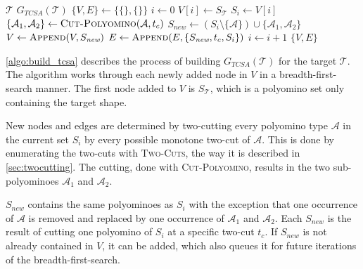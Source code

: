 \begin{algorithm}
	\caption{$\text{\scshape Build-TCSA-Graph}$}
	\label{algo:build_tcsa}
	\begin{algorithmic}[1]
		\REQUIRE $\mathcal{T}$ 
		\ENSURE $G_{\textit{TCSA}}(\mathcal{T})$  
		\STATE $\{V,E\} \gets \{\{\},\{\}\}$
		\STATE $i \gets 0$
		\STATE $V[i] \gets S_\mathcal{T}$ 
			\STATE $S_i \gets V[i]$
					\STATE $\{\mathcal{A}_1, \mathcal{A}_2\} \gets \text{\scshape Cut-Polyomino}(\mathcal{A}, t_c)$
					\STATE $S_\textit{new} \gets \left( S_i \setminus \{\mathcal{A}\} \right) \cup \{\mathcal{A}_1, \mathcal{A}_2\}$ 
						\STATE $V \gets \text{\scshape Append}(V, S_\textit{new})$
					\ENDIF
					\STATE $E \gets \text{\scshape Append}(E, \{S_\textit{new}, t_c, S_i\})$
				\ENDFOR
			\ENDFOR
			\STATE $i \gets i+1$
		\ENDWHILE
		\RETURN $\{V,E\}$
	\end{algorithmic}
\end{algorithm}

\autoref{algo:build_tcsa} describes the process of building $G_{\textit{TCSA}}(\mathcal{T})$ for the target $\mathcal{T}$.
The algorithm works through each newly added node in $V$ in a breadth-first-search manner.
The first node added to $V$ is $S_\mathcal{T}$, which is a polyomino set only containing the target shape.

New nodes and edges are determined by two-cutting every polyomino type $\mathcal{A}$ in the current set $S_i$ by every possible monotone two-cut of $\mathcal{A}$.
This is done by enumerating the two-cuts with {\scshape Two-Cuts}, the way it is described in \autoref{sec:twocutting}.
The cutting, done with {\scshape Cut-Polyomino}, results in the two sub-polyominoes $\mathcal{A}_1$ and $\mathcal{A}_2$.

$S_\textit{new}$ contains the same polyominoes as $S_i$ with the exception that one occurrence of $\mathcal{A}$ is removed and replaced by one occurrence of $\mathcal{A}_1$ and $\mathcal{A}_2$.
Each $S_\textit{new}$ is the result of cutting one polyomino of $S_i$ at a specific two-cut $t_c$.
If $S_\textit{new}$ is not already contained in $V$, it can be added, which also queues it for future iterations of the breadth-first-search.

